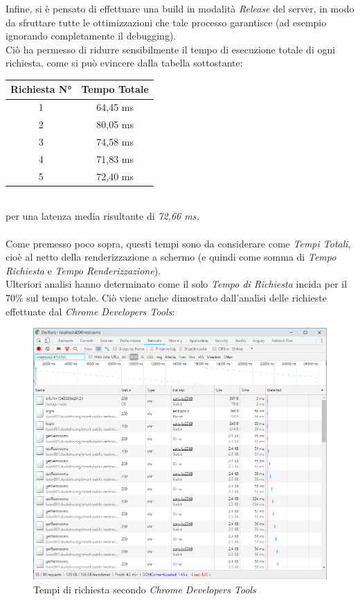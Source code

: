 \documentclass[12pt]{article}
\begin{document}
Infine, si è pensato di effettuare una build in modalità \textit{Release} del server, in modo da sfruttare tutte le ottimizzazioni che tale processo garantisce (ad esempio ignorando completamente il debugging).\\
Ciò ha permesso di ridurre sensibilmente il tempo di esecuzione totale di ogni richiesta, come si può evincere dalla tabella sottostante:
\begin{table}[h]
\begin{tabular}{|c|c|}
\hline
\textbf{Richiesta N°} & \textbf{Tempo Totale}  \\ \hline
1 & 64,45 ms  \\ \hline
2 & 80,05 ms \\ \hline
3 & 74,58 ms  \\ \hline
4 & 71,83 ms \\ \hline
5 & 72,40 ms \\ \hline
\end{tabular}
\end{table}\\
per una latenza media risultante di \textit{72,66 ms.}\\\\
Come premesso poco sopra, questi tempi sono da considerare come \textit{Tempi Totali}, cioè al netto della renderizzazione a schermo (e quindi come somma di \textit{Tempo Richiesta} e \textit{Tempo Renderizzazione}).\\
Ulteriori analisi hanno determinato come il solo \textit{Tempo di Richiesta} incida per il 70\% sul tempo totale.
\newpage
Ciò viene anche dimostrato dall'analisi delle richieste effettuate dal \textit{Chrome Developers Tools}:
\begin{figure}[h!]
\centering
  \includegraphics[scale=0.60]{img/network-timings.png}
  \caption{Tempi di richiesta secondo \textit{Chrome Developers Tools}}
\end{figure}
\end{document}
